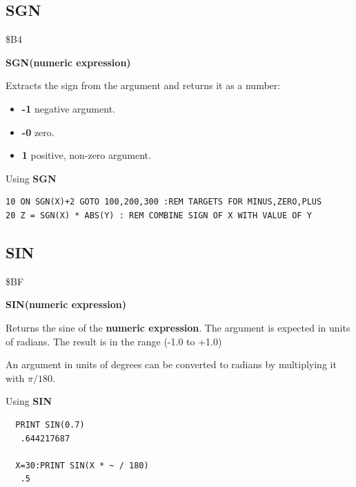 \subsection{SGN}
\begin{description}[leftmargin=2cm,style=nextline]
\item [Token:] \$B4
\item [Format:] {\bf SGN(numeric expression)}
\item [Usage:] Extracts the sign from
               the argument and returns it as a number:

                \begin{itemize}
                    \item {\bf -1} negative argument.
                    \item {\bf -0} zero.
                    \item {\bf 1} positive, non-zero argument.
                \end{itemize}

\item [Example:] Using {\bf SGN}
\begin{tcolorbox}[colback=black,coltext=white]
\verbatimfont{\codefont}
\begin{verbatim}
10 ON SGN(X)+2 GOTO 100,200,300 :REM TARGETS FOR MINUS,ZERO,PLUS
20 Z = SGN(X) * ABS(Y) : REM COMBINE SIGN OF X WITH VALUE OF Y
\end{verbatim}
\end{tcolorbox}
\end{description}


\newpage
\subsection{SIN}
\begin{description}[leftmargin=2cm,style=nextline]
\item [Token:] \$BF
\item [Format:] {\bf SIN(numeric expression)}
\item [Usage:] Returns the sine of the {\bf numeric expression}.
               The argument is expected in units of radians.
               The result is in the range (-1.0 to +1.0)

\item [Remarks:] An argument in units of degrees
                 can be converted to radians
               by multiplying it with $\pi/180$.
\item [Examples:] Using {\bf SIN}
\begin{tcolorbox}[colback=black,coltext=white]
\verbatimfont{\codefont}
\begin{verbatim}
  PRINT SIN(0.7)
   .644217687

  X=30:PRINT SIN(X * ~ / 180)
   .5
\end{verbatim}
\end{tcolorbox}
\end{description}

